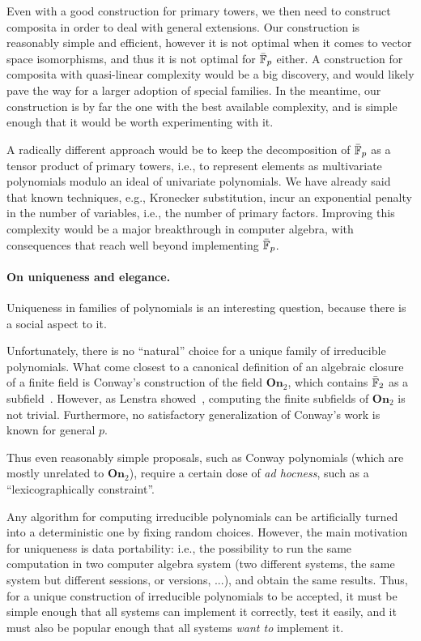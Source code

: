 \documentclass{report}
\theoremstyle{plain}
\theoremstyle{definition}
\begin{document}
Even with a good construction for primary towers, we then need to
construct composita in order to deal with general extensions. %
Our construction is reasonably simple and efficient, however it is not
optimal when it comes to vector space isomorphisms, and thus it is not
optimal for $\bar{\mathbb{F}}_p$ either. %
A construction for composita with quasi-linear complexity would be a
big discovery, and would likely pave the way for a larger adoption of
special families. %
In the meantime, our construction is by far the one with the best
available complexity, and is simple enough that it would be worth
experimenting with it. %

A radically different approach would be to keep the decomposition of
$\bar{\mathbb{F}}_p$ as a tensor product of primary towers, i.e., to represent
elements as multivariate polynomials modulo an ideal of univariate
polynomials. %
We have already said that known techniques, e.g., Kronecker
substitution, incur an exponential penalty in the number of variables,
i.e., the number of primary factors. %
Improving this complexity would be a major breakthrough in computer
algebra, with consequences that reach well beyond implementing
$\bar{\mathbb{F}}_p$.

\paragraph{On uniqueness and elegance.}
Uniqueness in families of polynomials is an interesting question,
because there is a social aspect to it. %

Unfortunately, there is no ``natural'' choice for a unique family of
irreducible polynomials. %
What come closest to a canonical definition of an algebraic closure of
a finite field is Conway's construction of the field $\mathbf{On}_2$,
which contains $\bar{\mathbb{F}}_2$ as a subfield~\cite{Conway:ONAG2000}. %
However, as Lenstra showed~\cite{LENSTRA1977389}, computing the finite
subfields of $\mathbf{On}_2$ is not trivial. %
Furthermore, no satisfactory generalization of Conway's work is known
for general $p$. %

Thus even reasonably simple proposals, such as Conway polynomials
(which are mostly unrelated to $\mathbf{On}_2$), require a certain
dose of \emph{ad hocness}, such as a ``lexicographically
constraint''. %

Any algorithm for computing irreducible polynomials can be
artificially turned into a deterministic one by fixing random
choices. %
However, the main motivation for uniqueness is data portability: i.e.,
the possibility to run the same computation in two computer algebra
system (two different systems, the same system but different sessions,
or versions, ...), and obtain the same results. %
Thus, for a unique construction of irreducible polynomials to be
accepted, it must be simple enough that all systems can implement it
correctly, test it easily, and it must also be popular enough that
all systems \emph{want to} implement it. %
\end{document}
